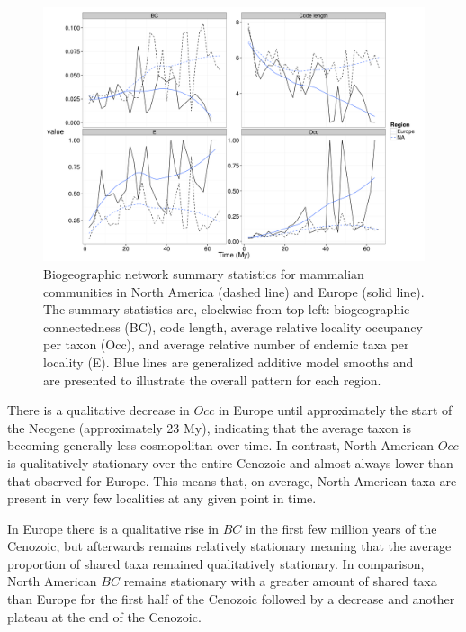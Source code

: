 \documentclass[12pt,letterpaper]{article}
\begin{document}
\begin{figure}[t]
  \begin{center}
    \includegraphics[height = 0.4\textheight, keepaspectratio = true]{figure/gen_bin}
  \end{center}
  \caption{Biogeographic network summary statistics for mammalian communities in North America (dashed line) and Europe (solid line). The summary statistics are, clockwise from top left: biogeographic connectedness (BC), code length, average relative locality occupancy per taxon (Occ), and average relative number of endemic taxa per locality (E). Blue lines are generalized additive model smooths and are presented to illustrate the overall pattern for each region.} 
  \label{fig:mam_tot}
\end{figure}

There is a qualitative decrease in \(Occ\) in Europe until approximately the start of the Neogene (approximately 23 My), indicating that the average taxon is becoming generally less cosmopolitan over time. In contrast, North American \(Occ\) is qualitatively stationary over the entire Cenozoic and almost always lower than that observed for Europe. This means that, on average, North American taxa are present in very few localities at any given point in time.

In Europe there is a qualitative rise in \(BC\) in the first few million years of the Cenozoic, but afterwards remains relatively stationary meaning that the average proportion of shared taxa remained qualitatively stationary. In comparison, North American \(BC\) remains stationary with a greater amount of shared taxa than Europe for the first half of the Cenozoic followed by a decrease and another plateau at the end of the Cenozoic.
\end{document}
